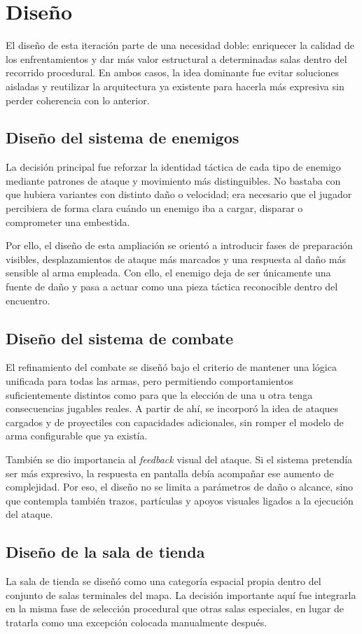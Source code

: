 \section{Diseño}
El diseño de esta iteración parte de una necesidad doble: enriquecer la calidad de los
enfrentamientos y dar más valor estructural a determinadas salas dentro del recorrido
procedural. En ambos casos, la idea dominante fue evitar soluciones aisladas y reutilizar la
arquitectura ya existente para hacerla más expresiva sin perder coherencia con lo anterior.

\subsection{Diseño del sistema de enemigos}
La decisión principal fue reforzar la identidad táctica de cada tipo de enemigo mediante
patrones de ataque y movimiento más distinguibles. No bastaba con que hubiera variantes con
distinto daño o velocidad; era necesario que el jugador percibiera de forma clara cuándo un
enemigo iba a cargar, disparar o comprometer una embestida.

Por ello, el diseño de esta ampliación se orientó a introducir fases de preparación visibles,
desplazamientos de ataque más marcados y una respuesta al daño más sensible al arma empleada.
Con ello, el enemigo deja de ser únicamente una fuente de daño y pasa a actuar como una
pieza táctica reconocible dentro del encuentro.

\subsection{Diseño del sistema de combate}
El refinamiento del combate se diseñó bajo el criterio de mantener una lógica unificada para
todas las armas, pero permitiendo comportamientos suficientemente distintos como para que la
elección de una u otra tenga consecuencias jugables reales. A partir de ahí, se incorporó la
idea de ataques cargados y de proyectiles con capacidades adicionales, sin romper el modelo
de arma configurable que ya existía.

También se dio importancia al \textit{feedback} visual del ataque. Si el sistema pretendía
ser más expresivo, la respuesta en pantalla debía acompañar ese aumento de complejidad. Por
eso, el diseño no se limita a parámetros de daño o alcance, sino que contempla también
trazos, partículas y apoyos visuales ligados a la ejecución del ataque.

\subsection{Diseño de la sala de tienda}
La sala de tienda se diseñó como una categoría espacial propia dentro del conjunto de salas
terminales del mapa. La decisión importante aquí fue integrarla en la misma fase de
selección procedural que otras salas especiales, en lugar de tratarla como una excepción
colocada manualmente después.

